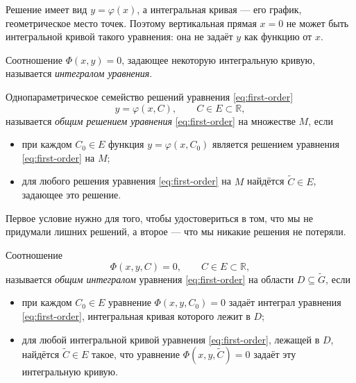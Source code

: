 \documentclass[12pt,a4paper]{article}
\numberwithin{equation}{section}
\begin{document}
Решение имеет вид \(y=\varphi(x)\), а интегральная кривая — его график, геометрическое место точек. Поэтому вертикальная прямая \(x=0\) не может быть интегральной кривой такого уравнения: она не задаёт \(y\) как функцию от \(x\).

\begin{definitionHSE}
Соотношение \(\Phi(x,y)=0\), задающее некоторую интегральную кривую, называется \textit{интегралом уравнения}.
\end{definitionHSE}

\begin{definitionHSE}
Однопараметрическое семейство решений уравнения \eqref{eq:first-order}
\[
y=\varphi(x,C),\qquad C\in E\subset\mathbb{R},
\]
называется \textit{общим решением уравнения} \eqref{eq:first-order} на множестве $M$, если
\begin{itemize}
\item при каждом $C_0\in E$ функция \(y=\varphi(x,C_0)\) является решением уравнения \eqref{eq:first-order} на \(M\);
\item для любого решения уравнения \eqref{eq:first-order} на \(M\) найдётся \(\tilde{C}\in E\), задающее это решение.
\end{itemize}
\end{definitionHSE}

Первое условие нужно для того, чтобы удостовериться в том, что мы не придумали лишних решений, а второе --- что мы никакие решения не потеряли.

\begin{definitionHSE}
Соотношение
\[
\Phi(x,y,C)=0,\qquad C\in E\subset\mathbb{R},
\]
называется \textit{общим интегралом} уравнения \eqref{eq:first-order} на области \(D\subseteq\tilde{G}\), если
\begin{itemize}
\item при каждом $C_0\in E$ уравнение \(\Phi(x,y,C_0)=0\) задаёт интеграл уравнения \eqref{eq:first-order}, интегральная кривая которого лежит в \(D\);
\item для любой интегральной кривой уравнения \eqref{eq:first-order}, лежащей в \(D\), найдётся $\tilde{C}\in E$ такое, что уравнение \(\Phi(x,y,\tilde{C})=0\) задаёт эту интегральную кривую.
\end{itemize}
\end{definitionHSE}

\begin{remarkHSE}
\end{remarkHSE}
\end{document}
